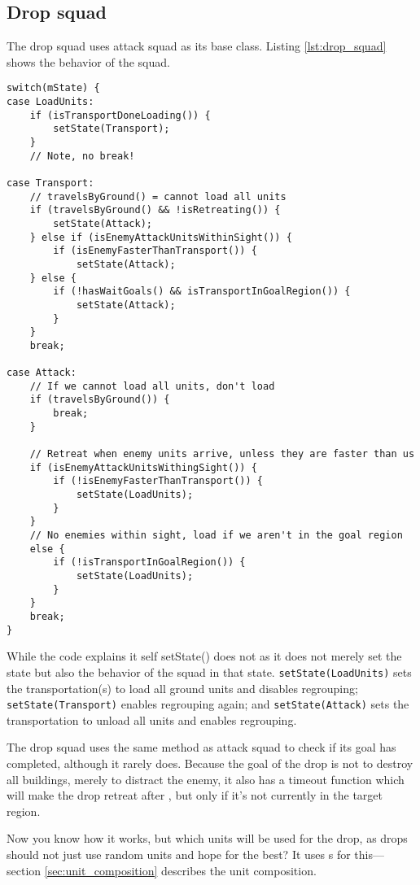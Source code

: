 \subsection{Drop squad}
\label{sec:drop_squad}
The drop squad uses attack squad as its base class. Listing \ref{lst:drop_squad} shows the behavior of the squad.
\begin{lstlisting}[caption={Drop squad behavior.},label={lst:drop_squad}]
switch(mState) {
case LoadUnits:
	if (isTransportDoneLoading()) {
		setState(Transport);
	}
	// Note, no break!

case Transport:
	// travelsByGround() = cannot load all units
	if (travelsByGround() && !isRetreating()) {
		setState(Attack);
	} else if (isEnemyAttackUnitsWithinSight()) {
		if (isEnemyFasterThanTransport()) {
			setState(Attack);
	} else {
		if (!hasWaitGoals() && isTransportInGoalRegion()) {
			setState(Attack);
		}
	}
	break;

case Attack:
	// If we cannot load all units, don't load
	if (travelsByGround()) {
		break;
	}

	// Retreat when enemy units arrive, unless they are faster than us
	if (isEnemyAttackUnitsWithingSight()) {
		if (!isEnemyFasterThanTransport()) {
			setState(LoadUnits);
		}
	}
	// No enemies within sight, load if we aren't in the goal region
	else {
		if (!isTransportInGoalRegion()) {
			setState(LoadUnits);
		}
	}
	break;
}
\end{lstlisting}
While the code explains it self setState() does not as it does not merely set the state but also the behavior of the squad in that state. \texttt{setState(LoadUnits)} sets the transportation(s) to load all ground units and disables regrouping; \texttt{setState(Transport)} enables regrouping again; and \texttt{setState(Attack)} sets the transportation to unload all units and enables regrouping.

The drop squad uses the same method as attack squad to check if its goal has completed, although it rarely does. Because the goal of the drop is not to destroy all buildings, merely to distract the enemy, it also has a timeout function which will make the drop retreat after \squadDropAttackTimeout, but only if it's not currently in the target region.

Now you know how it works, but which units will be used for the drop, as drops should not just use random units and hope for the best? It uses s for this—section \ref{sec:unit_composition} describes the unit composition. 

